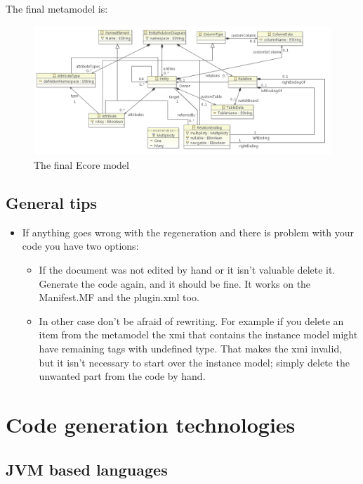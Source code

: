 \documentclass[]{report}
\let\Oldincludegraphics\includegraphics
\renewcommand{\includegraphics}[1]{
\begin{adjustbox}{max size={\textwidth}{\textheight}}
    \Oldincludegraphics[scale=0.6]{#1}%
\end{adjustbox}
}
\begin{document}
The final metamodel is:

\begin{figure}[htbp]
\centering
\includegraphics{img/emf/ERDiagram05_final.png}
\caption{The final Ecore model}
\end{figure}

\section{General tips}

\begin{itemize}
\itemsep1pt\parskip0pt
\item
  If anything goes wrong with the regeneration and there is problem with
  your code you have two options:

  \begin{itemize}
  \itemsep1pt\parskip0pt
  \item
    If the document was not edited by hand or it isn't valuable delete
    it. Generate the code again, and it should be fine. It works on the
    Manifest.MF and the plugin.xml too.
  \item
    In other case don't be afraid of rewriting. For example if you
    delete an item from the metamodel the xmi that contains the instance
    model might have remaining tags with undefined type. That makes the
    xmi invalid, but it isn't necessary to start over the instance
    model; simply delete the unwanted part from the code by hand.
  \end{itemize}
\end{itemize}

\chapter{Code generation technologies}

\section{JVM based languages}
\end{document}
